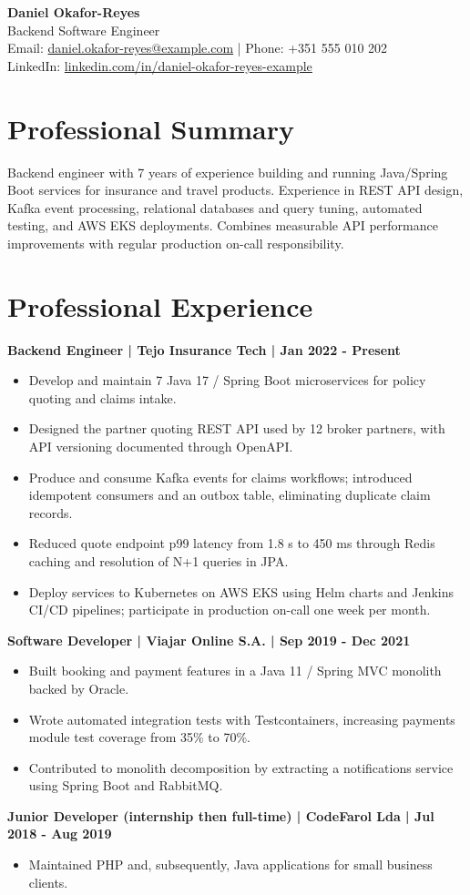 \documentclass[10pt,a4paper]{article}
\begin{document}
{\LARGE\bfseries\color{primarycolor} Daniel Okafor-Reyes}\\[0.2em]
{\large\color{accentcolor} Backend Software Engineer}\\[0.3em]
Email: \href{mailto:daniel.okafor-reyes@example.com}{daniel.okafor-reyes@example.com} | Phone: +351 555 010 202\\
LinkedIn: \href{https://linkedin.com/in/daniel-okafor-reyes-example}{linkedin.com/in/daniel-okafor-reyes-example}

\section*{Professional Summary}
Backend engineer with 7 years of experience building and running Java/Spring Boot services for insurance and travel products. Experience in REST API design, Kafka event processing, relational databases and query tuning, automated testing, and AWS EKS deployments. Combines measurable API performance improvements with regular production on-call responsibility.

\section*{Professional Experience}
\textbf{Backend Engineer | Tejo Insurance Tech | Jan 2022 - Present}
\begin{itemize}
\item Develop and maintain 7 Java 17 / Spring Boot microservices for policy quoting and claims intake.
\item Designed the partner quoting REST API used by 12 broker partners, with API versioning documented through OpenAPI.
\item Produce and consume Kafka events for claims workflows; introduced idempotent consumers and an outbox table, eliminating duplicate claim records.
\item Reduced quote endpoint p99 latency from 1.8 s to 450 ms through Redis caching and resolution of N+1 queries in JPA.
\item Deploy services to Kubernetes on AWS EKS using Helm charts and Jenkins CI/CD pipelines; participate in production on-call one week per month.
\end{itemize}
\textbf{Software Developer | Viajar Online S.A. | Sep 2019 - Dec 2021}
\begin{itemize}
\item Built booking and payment features in a Java 11 / Spring MVC monolith backed by Oracle.
\item Wrote automated integration tests with Testcontainers, increasing payments module test coverage from 35\% to 70\%.
\item Contributed to monolith decomposition by extracting a notifications service using Spring Boot and RabbitMQ.
\end{itemize}
\textbf{Junior Developer (internship then full-time) | CodeFarol Lda | Jul 2018 - Aug 2019}
\begin{itemize}
\item Maintained PHP and, subsequently, Java applications for small business clients.
\end{itemize}
\end{document}
